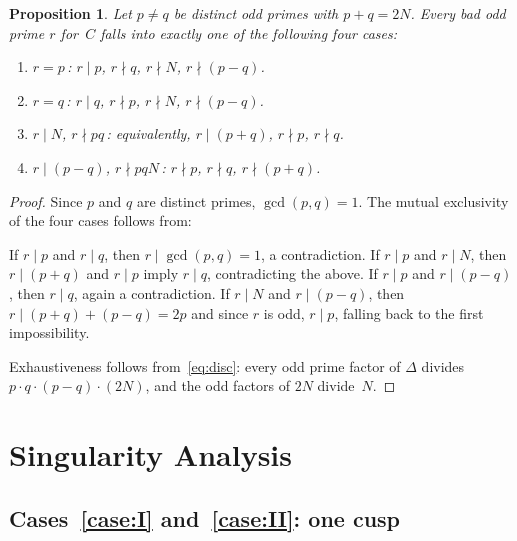 \documentclass[11pt,a4paper]{article}
\newtheorem{proposition}[theorem]{Proposition}
\theoremstyle{definition}
\theoremstyle{remark}
\begin{document}
\begin{proposition}\label{prop:cases}
  Let $p \ne q$ be distinct odd primes with $p + q = 2N$.
  Every bad odd prime $r$ for~$C$ falls into exactly one of the
  following four cases:
  \begin{enumerate}[nosep,label=\textup{(\Roman*)}]
  \item\label{case:I}
    $r = p$\,: \quad $r \mid p$, \; $r \nmid q$, \;
    $r \nmid N$, \; $r \nmid (p - q)$.
  \item\label{case:II}
    $r = q$\,: \quad $r \mid q$, \; $r \nmid p$, \;
    $r \nmid N$, \; $r \nmid (p - q)$.
  \item\label{case:III}
    $r \mid N$, \; $r \nmid pq$\,: \quad equivalently,
    $r \mid (p + q)$, $r \nmid p$, $r \nmid q$.
  \item\label{case:IV}
    $r \mid (p - q)$, \; $r \nmid pqN$\,: \quad
    $r \nmid p$, $r \nmid q$, $r \nmid (p + q)$.
  \end{enumerate}
\end{proposition}

\begin{proof}
  Since $p$ and $q$ are distinct primes, $\gcd(p, q) = 1$.
  The mutual exclusivity of the four cases follows from:

  If $r \mid p$ and $r \mid q$, then $r \mid \gcd(p,q) = 1$,
  a contradiction.
  If $r \mid p$ and $r \mid N$, then $r \mid (p + q)$ and
  $r \mid p$ imply $r \mid q$, contradicting the above.
  If $r \mid p$ and $r \mid (p - q)$, then $r \mid q$, again
  a contradiction.
  If $r \mid N$ and $r \mid (p - q)$, then
  $r \mid (p + q) + (p - q) = 2p$ and since $r$ is odd,
  $r \mid p$, falling back to the first impossibility.

  Exhaustiveness follows from~\eqref{eq:disc}: every odd prime
  factor of $\Delta$ divides $p \cdot q \cdot (p - q) \cdot (2N)$,
  and the odd factors of $2N$ divide~$N$.
\end{proof}


\section{Singularity Analysis}\label{sec:singular}

\subsection{Cases~\ref{case:I} and~\ref{case:II}: one cusp}
\end{document}
